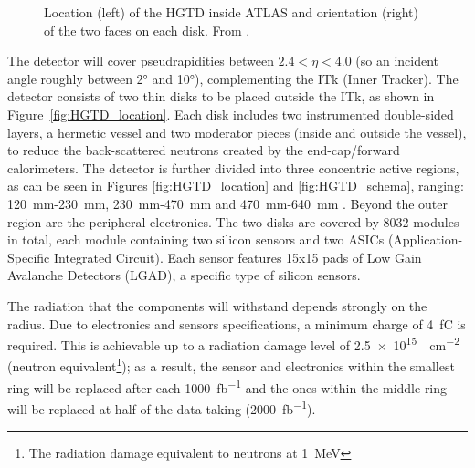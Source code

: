 \begin{figure}[h!tbp]
    \centering
    \hfill
    \centering
    \captionsetup{width=\captionwidth}
    \caption{Location (left) of the HGTD inside ATLAS and orientation (right) of the two faces on each disk. From \cite{cernTechnicalDesign}.}
\end{figure}

The detector will cover pseudrapidities between \(2.4 < \eta < 4.0\) (so an incident angle roughly between 2° and 10°), complementing the ITk (Inner Tracker).
The detector consists of two thin disks to be placed outside the ITk, as shown in Figure~\ref{fig:HGTD_location}. Each disk includes two instrumented double-sided layers, a hermetic vessel and two moderator pieces (inside and outside the vessel), to reduce the back-scattered neutrons created by the end-cap/forward calorimeters. The detector is further divided into three concentric active regions, as can be seen in Figures \ref{fig:HGTD_location} and \ref{fig:HGTD_schema}, ranging: \qty{120}{\milli\meter}-\qty{230}{\milli\meter}, \qty{230}{\milli\meter}-\qty{470}{\milli\meter} and \qty{470}{\milli\meter}-\qty{640}{\milli\meter} \cite{CERN-LHCC-2020-007}. Beyond the outer region are the peripheral electronics.
The two disks are covered by 8032 modules in total, each module containing two silicon sensors and two ASICs (Application-Specific Integrated Circuit). Each sensor features 15x15 pads of Low Gain Avalanche Detectors (LGAD), a specific type of silicon sensors.%

The radiation that the components will withstand depends strongly on the radius. Due to electronics and sensors specifications, a minimum charge of \qty{4}{\femto\coulomb} is required. This is achievable up to a radiation damage level of \qty{2.5e15}{\neutroneq\centi\meter^{-2}} (neutron equivalent\footnote{The radiation damage equivalent to neutrons at \qty{1}{\mega\electronvolt}}); as a result, the sensor and electronics within the smallest ring will be replaced after each \qty{1000}{\femto\barn^{-1}} and the ones within the middle ring will be replaced at half of the data-taking (\qty{2000}{\femto\barn^{-1}}).


